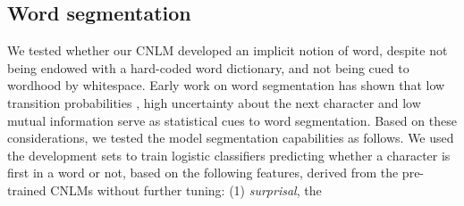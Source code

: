 \subsection{Word segmentation}
\label{sec:segmentation}

We tested whether our CNLM developed an implicit notion of word, despite not being endowed with a hard-coded word dictionary, and not being cued to wordhood by whitespace. %
Early work on word segmentation has shown that low transition
probabilities \cite{harris-distributional-1954, saffran-word-1996},
high uncertainty about the next character \cite{cohen-algorithm-2001,
  feng-accessor-2004} and low mutual information
\cite{sun-chinese-1998} serve as statistical cues to word
segmentation.  %
%
%
Based on these considerations, we tested the model segmentation
capabilities as follows. We used the development sets to
train  logistic classifiers predicting whether a character is first in
a word or not, based on the following features, derived from the
pre-trained CNLMs without further tuning: (1) \emph{surprisal}, the
